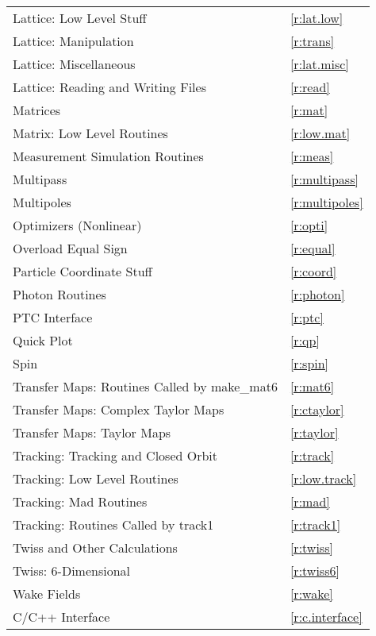 \begin{center}
\begin{tabular}{ll}
  Lattice: Low Level Stuff                    & \ref{r:lat.low}        \\
  Lattice: Manipulation                       & \ref{r:trans}          \\
  Lattice: Miscellaneous                      & \ref{r:lat.misc}       \\
  Lattice: Reading and Writing Files          & \ref{r:read}           \\
  Matrices                                    & \ref{r:mat}            \\
  Matrix: Low Level Routines                  & \ref{r:low.mat}        \\
  Measurement Simulation Routines             & \ref{r:meas}           \\
  Multipass                                   & \ref{r:multipass}      \\
  Multipoles                                  & \ref{r:multipoles}     \\
  Optimizers (Nonlinear)                      & \ref{r:opti}           \\
  Overload Equal Sign                         & \ref{r:equal}          \\
  Particle Coordinate Stuff                   & \ref{r:coord}          \\
  Photon Routines                             & \ref{r:photon}         \\
  PTC Interface                               & \ref{r:ptc}            \\
  Quick Plot                                  & \ref{r:qp}             \\
  Spin                                        & \ref{r:spin}           \\
  Transfer Maps: Routines Called by make_mat6 & \ref{r:mat6}           \\
  Transfer Maps: Complex Taylor Maps          & \ref{r:ctaylor}        \\
  Transfer Maps: Taylor Maps                  & \ref{r:taylor}         \\
  Tracking: Tracking and Closed Orbit         & \ref{r:track}          \\
  Tracking: Low Level Routines                & \ref{r:low.track}      \\
  Tracking: Mad Routines                      & \ref{r:mad}            \\
  Tracking: Routines Called by track1         & \ref{r:track1}         \\
  Twiss and Other Calculations                & \ref{r:twiss}          \\
  Twiss: 6-Dimensional                        & \ref{r:twiss6}         \\
  Wake Fields                                 & \ref{r:wake}           \\
  C/C++ Interface                             & \ref{r:c.interface}    \\
\end{tabular}
\end{center}
\toffset

